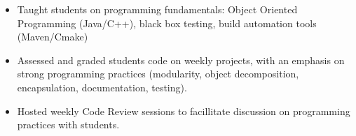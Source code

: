 \begin{itemize}
  \item Taught students on programming fundamentals: Object Oriented Programming (Java/C++), black box testing, build automation tools (Maven/Cmake)
  \item Assessed and graded students code on weekly projects, with an emphasis on strong programming practices (modularity, object decomposition, encapsulation, documentation, testing).
  \item Hosted weekly Code Review sessions to facillitate discussion on programming practices with students.
\end{itemize}